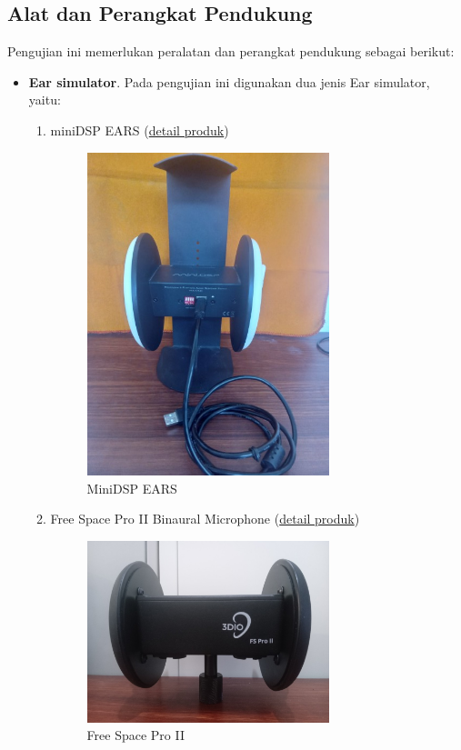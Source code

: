 \documentclass{article}
\begin{document}
	\subsection{Alat dan Perangkat Pendukung}
	Pengujian ini memerlukan peralatan dan perangkat pendukung sebagai berikut:
	\begin{itemize}
		\item \textbf{Ear simulator}. Pada pengujian ini digunakan dua jenis Ear simulator, yaitu:
		\begin{enumerate}
			\item miniDSP EARS (\href{https://www.minidsp.com/images/documents/Product%20Brief-EARS.pdf}{detail produk})
			\begin{figure}[H]
				\centering
				\includegraphics[width=200pt,angle=-90]{images/unit/ears}
				\caption{MiniDSP EARS}
			\end{figure}

			\item Free Space Pro II Binaural Microphone (\href{https://3diosound.com/products/free-space-pro-binaural-microphone}{detail produk})

			\begin{figure}[H]
				\centering
				\includegraphics[width=200pt,angle=0]{images/fspro/fspro}
				\caption{Free Space Pro II}
			\end{figure}


\end{enumerate}
\end{itemize}
\end{document}
